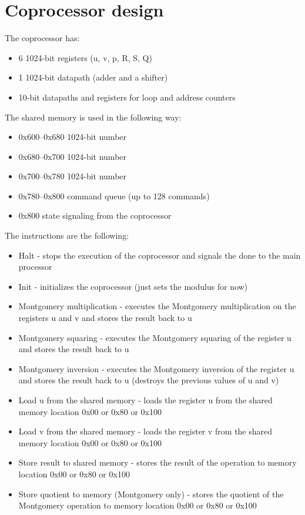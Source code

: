 \section{Coprocessor design}

The coprocessor has:
\begin{itemize}
\item 6 1024-bit registers (u, v, p, R, S, Q)
\item 1 1024-bit datapath (adder and a shifter)
\item 10-bit datapaths and registers for loop and address counters
\end{itemize}

\noindent
The shared memory is used in the following way:
\begin{itemize}
\item 0x600--0x680 1024-bit number
\item 0x680--0x700 1024-bit number
\item 0x700--0x780 1024-bit number
\item 0x780--0x800 command queue (up to 128 commands)
\item 0x800 state signaling from the coprocessor
\end{itemize}

\noindent
The instructions are the following:
\begin{itemize}
\item Halt - stops the execution of the coprocessor and signals the
  done to the main processor
\item Init - initializes the coprocessor (just sets the modulus for now)
\item Montgomery multiplication - executes the Montgomery
  multiplication on the registers u and v and stores the result back
  to u
\item Montgomery squaring - executes the Montgomery squaring of the
  register u and stores the result back to u
\item Montgomery inversion - executes the Montgomery inversion of the
  register u and stores the result back to u (destroys the previous
  values of u and v)
\item Load u from the shared memory - loads the register u from the
  shared memory location 0x00 or 0x80 or 0x100
\item Load v from the shared memory - loads the register v from the
  shared memory location 0x00 or 0x80 or 0x100
\item Store result to shared memory - stores the result of the
  operation to memory location 0x00 or 0x80 or 0x100
\item Store quotient to memory (Montgomery only) - stores the quotient
  of the Montgomery operation to memory location 0x00 or 0x80 or 0x100
\end{itemize}

